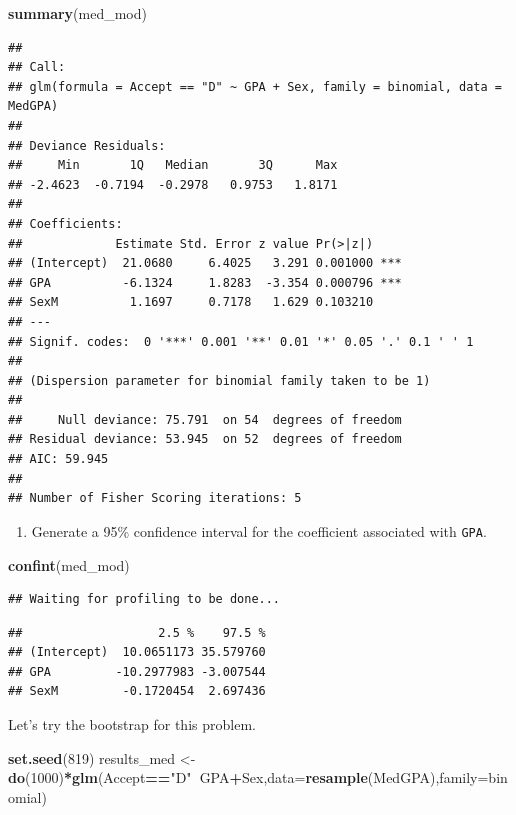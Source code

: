 \documentclass[
]{book}
\newenvironment{Shaded}{\begin{snugshade}}{\end{snugshade}}
\newcommand{\DataTypeTok}[1]{\textcolor[rgb]{0.13,0.29,0.53}{#1}}
\newcommand{\DecValTok}[1]{\textcolor[rgb]{0.00,0.00,0.81}{#1}}
\newcommand{\KeywordTok}[1]{\textcolor[rgb]{0.13,0.29,0.53}{\textbf{#1}}}
\newcommand{\NormalTok}[1]{#1}
\newcommand{\OperatorTok}[1]{\textcolor[rgb]{0.81,0.36,0.00}{\textbf{#1}}}
\newcommand{\StringTok}[1]{\textcolor[rgb]{0.31,0.60,0.02}{#1}}
\providecommand{\tightlist}{%
  \setlength{\itemsep}{0pt}\setlength{\parskip}{0pt}}
\begin{document}
\begin{Shaded}
\begin{Highlighting}[]
\KeywordTok{summary}\NormalTok{(med_mod)}
\end{Highlighting}
\end{Shaded}

\begin{verbatim}
## 
## Call:
## glm(formula = Accept == "D" ~ GPA + Sex, family = binomial, data = MedGPA)
## 
## Deviance Residuals: 
##     Min       1Q   Median       3Q      Max  
## -2.4623  -0.7194  -0.2978   0.9753   1.8171  
## 
## Coefficients:
##             Estimate Std. Error z value Pr(>|z|)    
## (Intercept)  21.0680     6.4025   3.291 0.001000 ***
## GPA          -6.1324     1.8283  -3.354 0.000796 ***
## SexM          1.1697     0.7178   1.629 0.103210    
## ---
## Signif. codes:  0 '***' 0.001 '**' 0.01 '*' 0.05 '.' 0.1 ' ' 1
## 
## (Dispersion parameter for binomial family taken to be 1)
## 
##     Null deviance: 75.791  on 54  degrees of freedom
## Residual deviance: 53.945  on 52  degrees of freedom
## AIC: 59.945
## 
## Number of Fisher Scoring iterations: 5
\end{verbatim}

\begin{enumerate}
\def\labelenumi{\alph{enumi}.}
\setcounter{enumi}{1}
\tightlist
\item
  Generate a 95\% confidence interval for the coefficient associated with \texttt{GPA}.
\end{enumerate}

\begin{Shaded}
\begin{Highlighting}[]
\KeywordTok{confint}\NormalTok{(med_mod)}
\end{Highlighting}
\end{Shaded}

\begin{verbatim}
## Waiting for profiling to be done...
\end{verbatim}

\begin{verbatim}
##                   2.5 %    97.5 %
## (Intercept)  10.0651173 35.579760
## GPA         -10.2977983 -3.007544
## SexM         -0.1720454  2.697436
\end{verbatim}

Let's try the bootstrap for this problem.

\begin{Shaded}
\begin{Highlighting}[]
\KeywordTok{set.seed}\NormalTok{(}\DecValTok{819}\NormalTok{)}
\NormalTok{results_med <-}\StringTok{ }\KeywordTok{do}\NormalTok{(}\DecValTok{1000}\NormalTok{)}\OperatorTok{*}\KeywordTok{glm}\NormalTok{(Accept}\OperatorTok{==}\StringTok{"D"}\OperatorTok{~}\NormalTok{GPA}\OperatorTok{+}\NormalTok{Sex,}\DataTypeTok{data=}\KeywordTok{resample}\NormalTok{(MedGPA),}\DataTypeTok{family=}\NormalTok{binomial)}
\end{Highlighting}
\end{Shaded}
\end{document}

